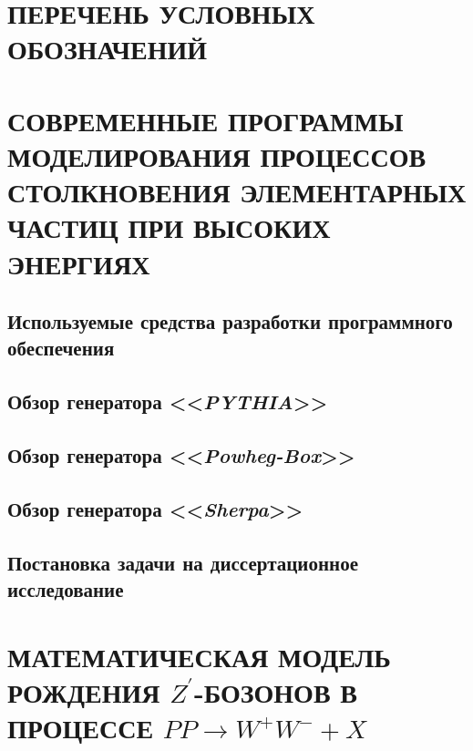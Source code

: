 \documentclass[12pt,a4paper]{styles/report}
\begin{document}
	
\renewcommand\contentsname{ОГЛАВЛЕНИЕ}
\renewcommand{\bibname}{БИБЛИОГРАФИЧЕСКИЙ СПИСОК}
\renewcommand\chaptername{ГЛАВА}
\renewcommand\figurename{Рисунок}
\renewcommand\tablename{Таблица}



\newpage
\pagestyle{plain}  \setcounter{page}{2}
\large \tableofcontents

\newpage
\chapter*{ПЕРЕЧЕНЬ УСЛОВНЫХ ОБОЗНАЧЕНИЙ}






\chapter{СОВРЕМЕННЫЕ ПРОГРАММЫ МОДЕЛИРОВАНИЯ ПРОЦЕССОВ СТОЛКНОВЕНИЯ ЭЛЕМЕНТАРНЫХ ЧАСТИЦ ПРИ ВЫСОКИХ ЭНЕРГИЯХ}

\section{Используемые средства разработки программного обеспечения}


\section{Обзор генератора <<\textit{PYTHIA}>>}

\section{Обзор генератора <<\textit{Powheg-Box}>>}

\section{Обзор генератора <<\textit{Sherpa}>>}

\section{Постановка задачи на диссертационное исследование}


\chapter{МАТЕМАТИЧЕСКАЯ МОДЕЛЬ РОЖДЕНИЯ $Z^\prime$-БОЗОНОВ В ПРОЦЕССЕ $PP \rightarrow W^+W^- + X$}
\end{document}
